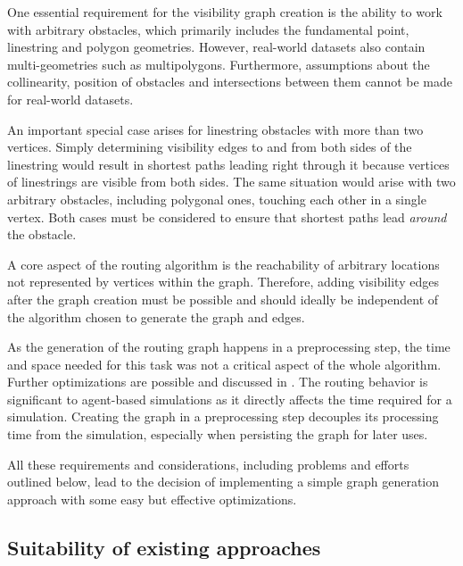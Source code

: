 		One essential requirement for the visibility graph creation is the ability to work with arbitrary obstacles, which primarily includes the fundamental point, linestring and polygon geometries.
		However, real-world datasets also contain multi-geometries such as multipolygons.
		Furthermore, assumptions about the collinearity, position of obstacles and intersections between them cannot be made for real-world datasets.
		
		An important special case arises for linestring obstacles with more than two vertices.
		Simply determining visibility edges to and from both sides of the linestring would result in shortest paths leading right through it because vertices of linestrings are visible from both sides.
		The same situation would arise with two arbitrary obstacles, including polygonal ones, touching each other in a single vertex.
		Both cases must be considered to ensure that shortest paths lead \emph{around} the obstacle.
		
		
		A core aspect of the routing algorithm is the reachability of arbitrary locations not represented by vertices within the graph.
		Therefore, adding visibility edges after the graph creation must be possible and should ideally be independent of the algorithm chosen to generate the graph and edges.
		
		As the generation of the routing graph happens in a preprocessing step, the time and space needed for this task was not a critical aspect of the whole algorithm.
		Further optimizations are possible and discussed in .
		The routing behavior is significant to agent-based simulations as it directly affects the time required for a simulation.
		Creating the graph in a preprocessing step decouples its processing time from the simulation, especially when persisting the graph for later uses.
		
		All these requirements and considerations, including problems and efforts outlined below, lead to the decision of implementing a simple graph generation approach with some easy but effective optimizations.
	
	\subsection{Suitability of existing approaches}
	\label{subsec:suitablilty-edge-creation-approaches}

